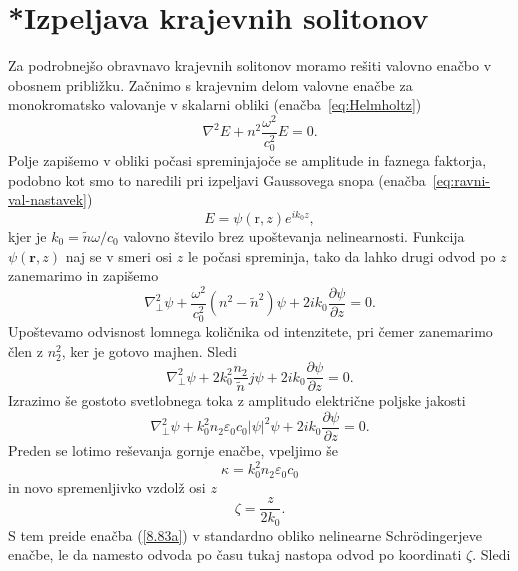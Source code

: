 \section{*Izpeljava krajevnih solitonov}
\label{chap:ks}
Za podrobnejšo obravnavo krajevnih solitonov moramo rešiti valovno 
enačbo v obosnem približku. Začnimo s krajevnim delom valovne 
enačbe za monokromatsko valovanje v skalarni obliki (enačba~\ref{eq:Helmholtz})
\begin{equation}
\nabla^{2}E+n^{2}\frac{\omega^{2}}{c_0^{2}}E=0.
\label{8.80}
\end{equation}
Polje zapišemo v obliki počasi spreminjajoče se amplitude in faznega faktorja, podobno kot 
smo to naredili pri izpeljavi Gaussovega snopa (enačba~\ref{eq:ravni-val-nastavek})
\begin{equation}
E=\psi(\mathrm{r},z)e^{ik_{0}z},
\label{8.81}
\end{equation}
 kjer je $k_{0}=\tilde{n}\omega/c_0$ valovno število brez upoštevanja nelinearnosti.
Funkcija $\psi(\mathbf{r},z)$ naj se v smeri osi $z$ le počasi spreminja, tako da lahko
drugi odvod po $z$ zanemarimo in zapišemo 
\begin{equation}
\nabla_{\bot}^{2}\psi+\frac{\omega^{2}}{c_0^{2}}(n^{2}-\tilde{n}^{2})\psi+2ik_{0}
\frac{\partial\psi}{\partial z}=0.
\label{8.82}
\end{equation}
Upoštevamo odvisnost lomnega količnika od intenzitete, pri čemer
zanemarimo člen z $n_{2}^{2}$, ker je gotovo majhen. Sledi
\begin{equation}
\nabla_{\bot}^{2}\psi+2k_{0}^{2}\frac{n_{2}}{\tilde{n}}j\psi+2ik_{0}\frac{\partial\psi}{\partial z}=0.
\label{8.83}
\end{equation}
Izrazimo še gostoto svetlobnega toka z amplitudo električne poljske jakosti 
\begin{equation}
\nabla_{\bot}^{2}\psi+
k_{0}^{2} n_2 \varepsilon_0 c_0 |\psi|^2 \psi+
2ik_{0}\frac{\partial\psi}{\partial z}=0.
\label{8.83a}
\end{equation}
Preden se lotimo reševanja gornje enačbe, vpeljimo še
\begin{equation}
\kappa=k_{0}^{2} n_2 \varepsilon_0 c_0
\end{equation}
 in novo spremenljivko vzdolž osi $z$
\begin{equation}
\zeta=\frac{z}{2k_{0}}.
\end{equation}
 S tem preide enačba (\ref{8.83a}) v standardno obliko nelinearne Schr\"odingerjeve
enačbe, le da namesto odvoda po času tukaj nastopa odvod po koordinati $\zeta$. Sledi
